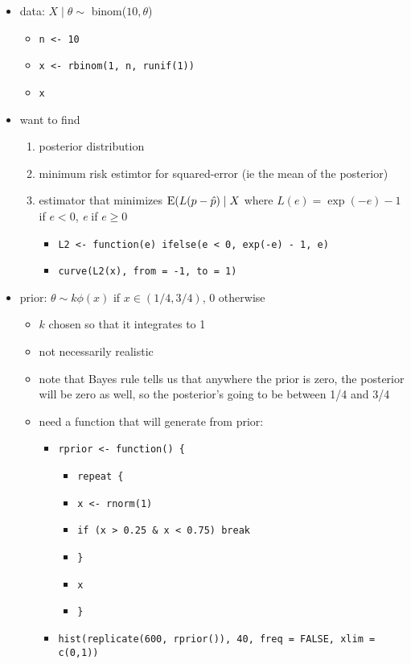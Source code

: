 \begin{itemize}
\item data: $X \mid \theta \sim$ binom($10, \theta$)
\begin{itemize}
\item \texttt{n <- 10}
\item \texttt{x <- rbinom(1, n, runif(1))}
\item \texttt{x}
\end{itemize}
\item want to find
\begin{enumerate}
\item posterior distribution
\item minimum risk estimtor for squared-error (ie the mean of the posterior)
\item estimator that minimizes $\operatorname{E}(L(p - \hat p) \mid X$ where
  $L(e) = \exp(-e) - 1$ if $e < 0$, \emph{e} if $e \geq 0$
\begin{itemize}
\item \texttt{L2 <- function(e) ifelse(e < 0, exp(-e) - 1, e)}
\item \texttt{curve(L2(x), from = -1, to = 1)}
\end{itemize}
\end{enumerate}
\item prior: $\theta \sim k \phi(x)$ if $x \in (1/4, 3/4)$, 0 otherwise
\begin{itemize}
\item $k$ chosen so that it integrates to 1
\item not necessarily realistic
\item note that Bayes rule tells us that anywhere the prior is zero,
         the posterior will be zero as well, so the posterior's going to be 
         between 1/4 and 3/4
\item need a function that will generate from prior:
\begin{itemize}
\item \texttt{rprior <- function() \{}
\begin{itemize}
\item \texttt{repeat \{}
\item \texttt{x <- rnorm(1)}
\item \texttt{if (x > 0.25 \& x < 0.75) break}
\item \texttt{\}}
\item \texttt{x}
\item \texttt{\}}
\end{itemize}
\item \texttt{hist(replicate(600, rprior()), 40, freq = FALSE, xlim = c(0,1))}

\end{itemize}
\end{itemize}
\end{itemize}
